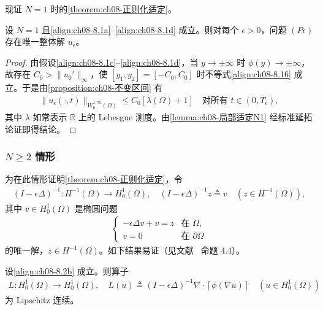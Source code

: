 \documentclass[../../main.tex]{subfiles}%
\begin{document}
现证 $N=1$ 时的\cref{theorem:ch08-正则化适定}。

\begin{proposition}[$N=1$ 整体解存在唯一]\label{proposition:ch08-整体N1}
设 $N=1$ 且\eqref{align:ch08-8.1a}--\eqref{align:ch08-8.1d} 成立。则对每个 $\epsilon>0$，问题 $(P\epsilon)$ 存在唯一整体解 $u_\epsilon$。
\end{proposition}

\begin{proof}
由假设\eqref{align:ch08-8.1c}--\eqref{align:ch08-8.1d}，当 $y\to\pm\infty$ 时 $\phi(y)\to\pm\infty$，故存在 $C_0>\|u_0'\|_\infty$，使 $[y_1,y_2]=[-C_0,C_0]$ 时不等式\eqref{align:ch08-8.16} 成立。于是由\cref{proposition:ch08-不变区间} 有
\begin{align}
\|u_\epsilon(\cdot,t)\|_{W^{1,\infty}_0(\Omega)}\leqslant C_0[\lambda(\Omega)+1]\quad\text{对所有 }t\in(0,T_\epsilon), \label{align:ch08-8.17}
\end{align}
其中 $\lambda$ 如常表示 $\mathbb{R}$ 上的 Lebesgue 测度。由\cref{lemma:ch08-局部适定N1} 经标准延拓论证即得结论。
\end{proof}

\subsubsection{$N\geqslant2$ 情形}\label{subsubsection:ch08-N2存在}

为在此情形证明\cref{theorem:ch08-正则化适定}，令
\begin{align*}
(I-\epsilon\Delta)^{-1}:H^{-1}(\Omega)\to H^1_0(\Omega),\quad
(I-\epsilon\Delta)^{-1}z\triangleq v\quad(z\in H^{-1}(\Omega)),
\end{align*}
其中 $v\in H^1_0(\Omega)$ 是椭圆问题
\begin{align}
\begin{cases}
-\epsilon\Delta v+v=z & \text{在 }\Omega,\\
v=0 & \text{在 }\partial\Omega
\end{cases} \label{align:ch08-8.18}
\end{align}
的唯一解，$z\in H^{-1}(\Omega)$。如下结果易证（见文献~\cite{ref30} 命题 4.4）。

\begin{proposition}\label{proposition:ch08-Lipschitz算子}
设\eqref{align:ch08-8.2b} 成立。则算子
\begin{align}
L:H^1_0(\Omega)\to H^1_0(\Omega),\quad
L(u)\triangleq (I-\epsilon\Delta)^{-1}\nabla\cdot[\phi(\nabla u)]\quad(u\in H^1_0(\Omega)) \label{align:ch08-8.19}
\end{align}
为 Lipschitz 连续。
\end{proposition}
\end{document}

